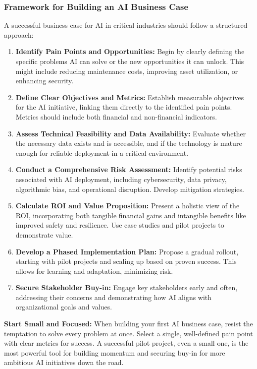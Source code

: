 \subsubsection{Framework for Building an AI Business Case}
A successful business case for AI in critical industries should follow a structured approach:
\begin{enumerate}
    \item \textbf{Identify Pain Points and Opportunities:} Begin by clearly defining the specific problems AI can solve or the new opportunities it can unlock. This might include reducing maintenance costs, improving asset utilization, or enhancing security.
    \item \textbf{Define Clear Objectives and Metrics:} Establish measurable objectives for the AI initiative, linking them directly to the identified pain points. Metrics should include both financial and non-financial indicators.
    \item \textbf{Assess Technical Feasibility and Data Availability:} Evaluate whether the necessary data exists and is accessible, and if the technology is mature enough for reliable deployment in a critical environment.
    \item \textbf{Conduct a Comprehensive Risk Assessment:} Identify potential risks associated with AI deployment, including cybersecurity, data privacy, algorithmic bias, and operational disruption. Develop mitigation strategies.
    \item \textbf{Calculate ROI and Value Proposition:} Present a holistic view of the ROI, incorporating both tangible financial gains and intangible benefits like improved safety and resilience. Use case studies and pilot projects to demonstrate value.
    \item \textbf{Develop a Phased Implementation Plan:} Propose a gradual rollout, starting with pilot projects and scaling up based on proven success. This allows for learning and adaptation, minimizing risk.
    \item \textbf{Secure Stakeholder Buy-in:} Engage key stakeholders early and often, addressing their concerns and demonstrating how AI aligns with organizational goals and values.
\end{enumerate}

\begin{tipbox}
\textbf{Start Small and Focused:} When building your first AI business case, resist the temptation to solve every problem at once. Select a single, well-defined pain point with clear metrics for success. A successful pilot project, even a small one, is the most powerful tool for building momentum and securing buy-in for more ambitious AI initiatives down the road.
\end{tipbox}


